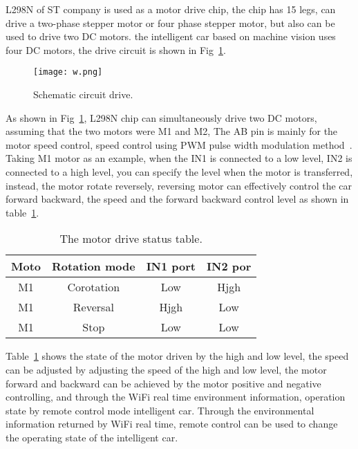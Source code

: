 \documentclass[10pt,twocolumn,letterpaper]{article}
\begin{document}
L298N of ST company is used as a motor drive chip, the chip has 15 legs, can drive a two-phase stepper motor or four phase stepper motor, but also can be used to drive two DC motors. the intelligent car based on machine vision uses four DC motors, the drive circuit is shown in Fig~\ref{2}.
\begin{figure}[!htb]
\centering
\texttt{[image: w.png]}
\caption{Schematic circuit drive. }
\label{2}
\end{figure}
As shown in Fig~\ref{2}, L298N chip can simultaneously drive two DC motors, assuming that the two motors were M1 and M2, The AB pin is mainly for the motor speed control, speed control using PWM pulse width modulation method~\cite{fikes1971classification}. Taking M1 motor as an example, when the IN1 is connected to a low level, IN2 is connected to a high level, you can specify the level when the motor is transferred, instead, the motor rotate reversely, reversing motor can effectively control the car forward backward, the speed and the forward backward control level as shown in table~\ref{table1}.




\begin{table}[!htb]
\centering
\caption{The motor drive status table.}
\label{table1}

\begin{tabular}{|c|c|c|c|}
\hline
Moto &Rotation mode &IN1 port &IN2 por \\
\hline\hline
M1 &Corotation  &Low &Hjgh  \\
M1 &Reversal &Hjgh &Low  \\
M1 & Stop & Low & Low  \\
\hline
\end{tabular}


\end{table}
Table~\ref{table1} shows the state of the motor driven by the high and low level, the speed can be adjusted by adjusting the speed of the high and low level, the motor forward and backward can be achieved by the motor positive and negative controlling, and through the WiFi real time environment information, operation state by remote control mode intelligent car. Through the environmental information returned by WiFi real time, remote control can be used to change the operating state of the intelligent car.
{\small


}
\end{document}
